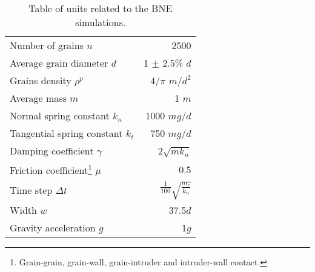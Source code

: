 \begin{table}
    \centering
    \begin{tabular}{l r}
        \hline
        Number of grains $n$ & 2500 \\
        Average grain diameter $d$ & 1 $\pm$ 2.5\% $d$\\
        Grains density $\rho^p$ & 4/$\pi$ $m/d^2$\\
        Average mass $m$ & 1 $m$\\
        Normal spring constant $k_{n}$ & 1000 $m g/d$\\
        Tangential spring constant $k_{t}$ & 750 $m g/d$ \\
        Damping coefficient $\gamma$ & 2$\sqrt{m k_{n}}$ \\
        Friction coefficient\footnote{Grain-grain, grain-wall, grain-intruder and intruder-wall contact.} $\mu$ & 0.5 \\
        Time step $\Delta t$ & $\frac{1}{100}\sqrt{\frac{m_r}{k_n}}$ \\
        Width $w$ & 37.5$d$ \\
        Gravity acceleration $g$ & 1$g$ \\
        \hline \hline
    \end{tabular}
    \caption{Table of units related to the BNE simulations.}
    \label{tab:BNE}
\end{table}
